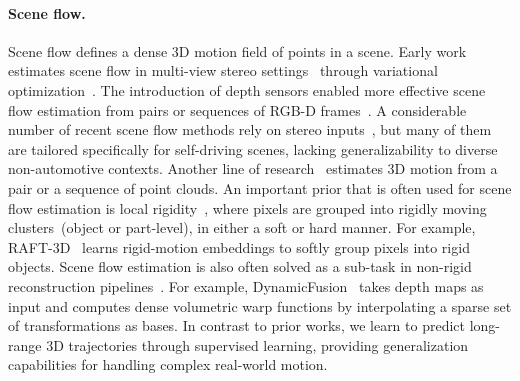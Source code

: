 \paragraph{Scene flow.}
Scene flow defines a dense 3D motion field of points in a scene. Early work estimates scene flow in multi-view stereo settings~\cite{vedula1999three,pons2007multi,zhang20013d} through variational optimization~\cite{huguet2007variational}. The introduction of depth sensors enabled more effective scene flow estimation from pairs or sequences of RGB-D frames~\cite{hadfield2011kinecting,raft3D,jaimez2015primal,wang2020flownet3d++,hornacek2014sphereflow,herbst2013rgb,quiroga2014dense}.  A considerable number of recent scene flow methods rely on stereo inputs~\cite{ma2019deep,menze2015object}, but many of them are tailored specifically for self-driving scenes, lacking generalizability to diverse non-automotive contexts. Another line of research~\cite{liu2019flownet3d,wu2020pointpwc,gu2019hplflownet,niemeyer2019occupancy,lei2022cadex,bozic2021neuraldeformationgraphs} estimates 3D motion from a pair or a sequence of point clouds. 
An important prior that is often used for scene flow estimation is local rigidity~\cite{vogel20113d,vogel2013piecewise}, where pixels are grouped into rigidly moving clusters~(object or part-level), in either a soft or hard manner. For example, RAFT-3D~\cite{raft3D} learns rigid-motion embeddings to softly group pixels into rigid objects. Scene flow estimation is also often solved as a sub-task in non-rigid reconstruction pipelines~\cite{keller2013real,lin2022occlusionfusion,newcombe2011kinectfusion}. For example, DynamicFusion~\cite{dynamicfusion} takes depth maps as input and computes dense volumetric warp functions by interpolating a sparse set of transformations as bases. In contrast to prior works, we learn to predict long-range 3D trajectories through supervised learning, providing generalization capabilities for handling complex real-world motion.
























